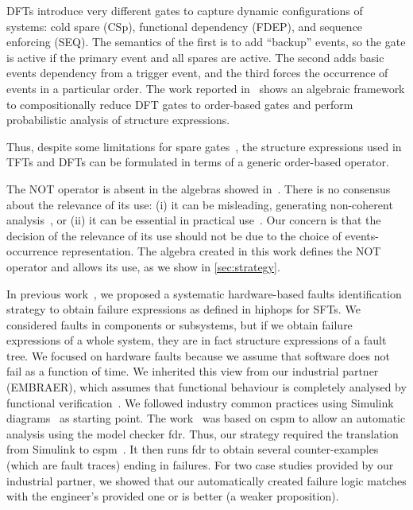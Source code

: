 \documentclass[en,twoside,onehalfspacing,phd]{risethesis}
\newcommand{\EMBRAER}{EMBRAER\xspace}
\newcommand{\simulink}{Simulink\xspace}
\begin{document}
\Acp{DFT} introduce very different gates to capture dynamic configurations of systems: cold spare (\acs{CSp}), functional dependency (\acs{FDEP}), and sequence enforcing (\acs{SEQ}).
The semantics of the first is to add ``backup'' events, so the gate is active if the primary event and all spares are active.
The second adds basic events dependency from a trigger event, and the third forces the occurrence of events in a particular order.
The work reported in~\cite{MRL2011} shows an algebraic framework to compositionally reduce \ac{DFT} gates to order-based gates and perform probabilistic analysis of structure expressions.

Thus, despite some limitations for spare gates~\cite{MRL2014}, the structure expressions used in \acp{TFT} and \acp{DFT} can be formulated in terms of a generic order-based operator.

The NOT operator is absent in the algebras showed in~\cite{WP2009,Walker2009,Merle2010,MRL2011b}.
There is no consensus about the relevance of its use: (i) it can be misleading, generating non-coherent analysis~\cite{Oliv2006}, or (ii) it can be essential in practical use~\cite{Andrews2001}.
Our concern is that the decision of the relevance of its use should not be due to the choice of events-occurrence representation.
The algebra created in this work defines the NOT operator and allows its use, as we show in \cref{sec:strategy}.

In previous work~\cite{Didier2012,DM2012}, we proposed a systematic hardware-based faults identification strategy to obtain failure expressions as defined in \acs{hiphops} for \acp{SFT}.
We considered faults in components or subsystems, but if we obtain failure expressions of a whole system, they are in fact structure expressions of a fault tree.
%
%
We focused on hardware faults because we assume that software does not fail as a function of time.
%
We inherited this view from our industrial partner (\EMBRAER), which assumes that functional behaviour is completely analysed by functional verification~\cite{SP2011}.
%
We followed industry common practices using \simulink diagrams~\cite{Nise1992} as starting point.
%
The work~\cite{DM2012} was based on \ac{cspm} to allow an automatic analysis using the model checker \acs{fdr}.
%
Thus, our strategy required the translation from \simulink to \ac{cspm}~\cite{JMS+2011}.
%
It then runs \acs{fdr} to obtain several counter-examples (which are fault traces) ending in failures.
%
For two case studies provided by our industrial partner, we showed that our automatically created failure logic matches with the engineer's provided one or is better (a weaker proposition).
\end{document}
